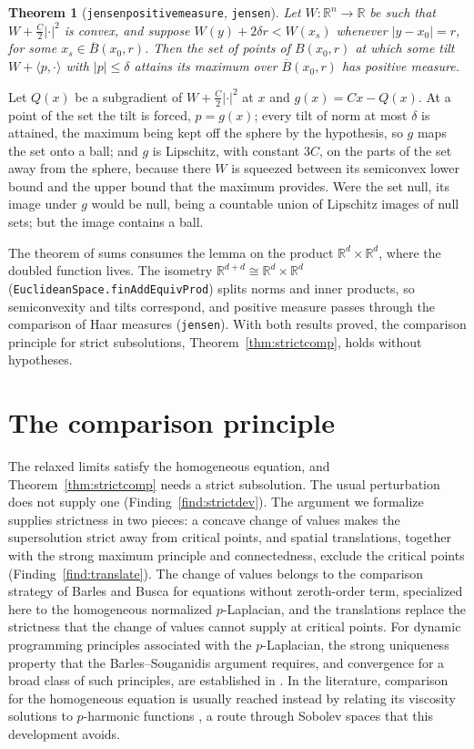 \documentclass[11pt,reqno]{amsart}
\newcommand{\LEANREF}[1]{\texttt{\small\def\_{\textunderscore\allowbreak}#1}}
\newcommand{\R}{\mathbb{R}}
\theoremstyle{plain}
\newtheorem{theorem}{Theorem}[section]
\theoremstyle{definition}
\begin{document}
\begin{theorem}[\LEANREF{jensen\_positive\_measure}, \LEANREF{jensen}]\label{thm:jensen}
Let $W\colon \R^n \to \R$ be such that $W + \tfrac C2 |\cdot|^2$ is convex, and
suppose $W(y) + 2\delta r < W(x_s)$ whenever $|y - x_0| = r$, for some
$x_s \in \overline B(x_0, r)$. Then the set of points of $B(x_0, r)$ at which
some tilt $W + \langle p, \cdot\rangle$ with $|p| \le \delta$ attains its
maximum over $\overline B(x_0, r)$ has positive measure.
\end{theorem}

Let $Q(x)$ be a subgradient of $W + \tfrac C2|\cdot|^2$ at $x$ and
$g(x) = Cx - Q(x)$. At a point of the set the tilt is forced, $p = g(x)$; every
tilt of norm at most $\delta$ is attained, the maximum being kept off the sphere
by the hypothesis, so $g$ maps the set onto a ball; and $g$ is Lipschitz, with
constant $3C$, on the parts of the set away from the sphere, because there $W$
is squeezed between its semiconvex lower bound and the upper bound that the
maximum provides. Were the set null, its image under $g$ would be null, being a
countable union of Lipschitz images of null sets; but the image contains a
ball.

The theorem of sums consumes the lemma on the product $\R^d \times \R^d$, where
the doubled function lives. The isometry $\R^{d+d} \cong \R^d \times \R^d$
(\LEANREF{EuclideanSpace.finAddEquivProd}) splits norms and inner products, so
semiconvexity and tilts correspond, and positive measure passes through the
comparison of Haar measures (\LEANREF{jensen}). With both results proved, the
comparison principle for strict subsolutions, Theorem~\ref{thm:strictcomp},
holds without hypotheses.

\section{The comparison principle}\label{sec:comparison}

The relaxed limits satisfy the homogeneous equation, and
Theorem~\ref{thm:strictcomp} needs a strict subsolution. The usual perturbation
does not supply one (Finding~\ref{find:strictdev}). The argument we formalize
supplies strictness in two pieces: a concave change of values makes the
supersolution strict away from critical points, and spatial translations,
together with the strong maximum principle and connectedness, exclude the
critical points (Finding~\ref{find:translate}). The change of values belongs to the
comparison strategy of Barles and Busca \cite{BB01} for equations without
zeroth-order term, specialized here to the homogeneous normalized
$p$-Laplacian, and the translations replace the strictness that the change of
values cannot supply at critical points. For dynamic programming principles
associated with the $p$-Laplacian, the strong uniqueness property that the
Barles--Souganidis argument requires, and convergence for a broad class of
such principles, are established in \cite{dTMP22}. In the literature, comparison for the homogeneous equation is
usually reached instead by relating its viscosity solutions to $p$-harmonic
functions \cite{JLM01}, a route through Sobolev spaces that this development
avoids.
\end{document}
